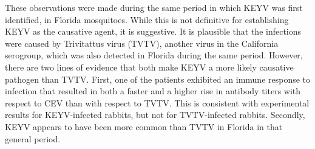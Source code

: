 \documentclass[12pt]{article}
\newcommand{\cjh}{\textcolor{blue}{cjh}}
\newcommand{\tjh}{\textcolor{red}{tjh}}
\newcommand{\jal}{\textcolor{green}{jal}}
\newcommand{\jgm}{\textcolor{purple}{jgm}}
\newcommand{\msg}[3]{(#1 $\rightarrow$ #2: #3)}
\newcommand{\mcc}[1]{\msg\cjh\cjh{#1}}
\newcommand{\mct}[1]{\msg\cjh\tjh{#1}}
\newcommand{\mjc}[1]{\msg\jal\cjh{#1}}
\newcommand{\mgc}[1]{\msg\jgm\cjh{#1}}
\begin{document}
    These observations were made during the same period in which KEYV was first identified, in Florida mosquitoes.\cite{bond1966california} %
    While this is not definitive for establishing KEYV as the causative agent, it is suggestive.  It is plausible that the infections were caused by Trivitattus virus (TVTV), another virus in the California serogroup, which was also detected in Florida during the same period. However, there are two lines of evidence that both make KEYV a more likely causative pathogen than TVTV. First, one of the patients exhibited an immune response to infection that resulted in both a faster and a higher rise in antibody titers with respect to CEV than with respect to TVTV\cite{quick1965california}. This is consistent with experimental results for KEYV-infected rabbits, but not for TVTV-infected rabbits\cite{jennings1968california}.%
    Secondly, KEYV appears to have been more common than TVTV in Florida in that general period\cite{taylor1971california}. %
    
    
\end{document}
